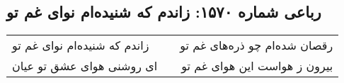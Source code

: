 \begin{center}
\section*{رباعی شماره ۱۵۷۰: زاندم که شنیده‌ام نوای غم تو}
\label{sec:1570}
\begin{longtable}{l p{0.5cm} r}
زاندم که شنیده‌ام نوای غم تو
&&
رقصان شده‌ام چو ذره‌های غم تو
\\
ای روشنی هوای عشق تو عیان
&&
بیرون ز هواست این هوای غم تو
\\
\end{longtable}
\end{center}
